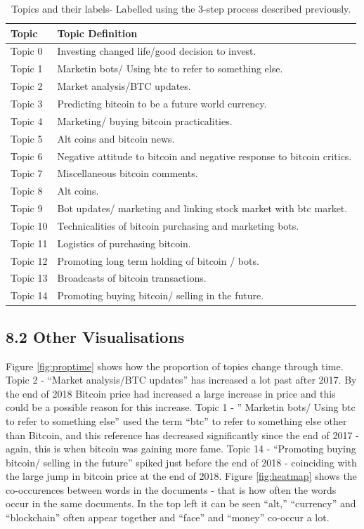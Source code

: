 \documentclass[
]{article}
\begin{document}
\begin{table}

\caption{\label{tab:topicdeftable}Topics and their labels- Labelled using the 3-step process described previously.}
\centering
\begin{tabular}[t]{l|l}
\hline
Topic & Topic Definition\\
\hline
Topic 0 & Investing changed life/good decision to invest.\\
\hline
Topic 1 & Marketin bots/ Using btc to refer to something else.\\
\hline
Topic 2 & Market analysis/BTC updates.\\
\hline
Topic 3 & Predicting bitcoin to be a future world currency.\\
\hline
Topic 4 & Marketing/ buying bitcoin practicalities.\\
\hline
Topic 5 & Alt coins and bitcoin news.\\
\hline
Topic 6 & Negative attitude to bitcoin and negative response to bitcoin critics.\\
\hline
Topic 7 & Miscellaneous bitcoin comments.\\
\hline
Topic 8 & Alt coins.\\
\hline
Topic 9 & Bot updates/ marketing and linking stock market with btc market.\\
\hline
Topic 10 & Technicalities of bitcoin purchasing and marketing bots.\\
\hline
Topic 11 & Logistics of purchasing bitcoin.\\
\hline
Topic 12 & Promoting long term holding of bitcoin / bots.\\
\hline
Topic 13 & Broadcasts of bitcoin transactions.\\
\hline
Topic 14 & Promoting buying bitcoin/ selling in the future.\\
\hline
\end{tabular}
\end{table}

\hypertarget{other-visualisations}{%
\subsection{8.2 Other Visualisations}\label{other-visualisations}}

Figure \ref{fig:proptime} shows how the proportion of topics change
through time. Topic 2 - ``Market analysis/BTC updates'' has increased a
lot past after 2017. By the end of 2018 Bitcoin price had increased a
large increase in price and this could be a possible reason for this
increase. Topic 1 - '' Marketin bots/ Using btc to refer to something
else'' used the term ``btc'' to refer to something else other than
Bitcoin, and this reference has decreased significantly since the end of
2017 - again, this is when bitcoin was gaining more fame. Topic 14 -
``Promoting buying bitcoin/ selling in the future'' spiked just before
the end of 2018 - coinciding with the large jump in bitcoin price at the
end of 2018. Figure \ref{fig:heatmap} shows the co-occurences between
words in the documents - that is how often the words occur in the same
documents. In the top left it can be seen ``alt,'' ``currency'' and
``blockchain'' often appear together and ``face'' and ``money'' co-occur
a lot.
\end{document}
